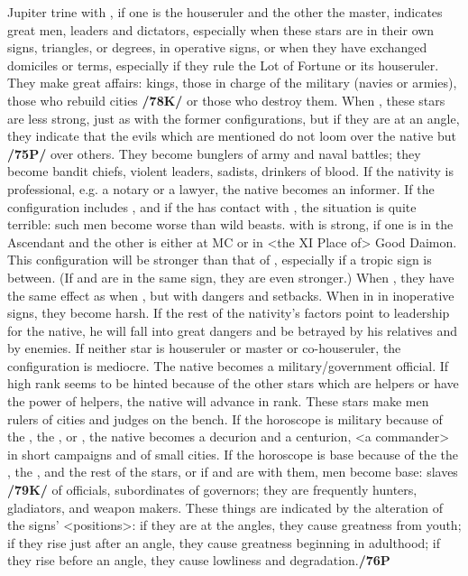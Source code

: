 Jupiter \marginnote{\Jupiter \Trine \Mars} trine with \Mars, if one is the houseruler and the other the master, indicates great men, leaders and dictators, especially when these stars are in their own signs, triangles, or degrees, in operative signs, or when they have exchanged domiciles or terms, especially if they rule the Lot of Fortune or its houseruler. They make great affairs: kings, those in charge of the military (navies or armies), those who rebuild cities
\textbf{/78K/} or those who destroy them. When \Sextile, these stars are less strong, just as with the former configurations, but if they are at an \mndl angle, they indicate that the evils which are mentioned do not loom over the native but \textbf{/75P/} over others. They become bunglers of army and naval battles; they become bandit chiefs, violent leaders, sadists, drinkers of blood. If the nativity is professional, e.g. a notary or a lawyer, the native becomes an informer. If the configuration includes \Mercury, and if the \Moon\xspace has contact with \Mars, the situation is quite terrible: such men become worse than wild beasts. \Jupiter\xspace \Square\xspace with \Mars\xspace is strong, if one is in the Ascendant and the other is either at MC or in <the
XI Place of> Good Daimon. This configuration will be stronger than that of \Trine, especially if a tropic
sign is between. (If \Jupiter\xspace and \Mars\xspace are in the same sign, they are even stronger.) When \Square, they
have the same effect as when \Trine, but with dangers and setbacks. When in \Opposition in inoperative signs, they become harsh. If the rest of the nativity’s factors point to leadership for the native, he will fall into great dangers and be betrayed by his relatives and by enemies. \mndl If neither star is houseruler or master or co-houseruler, the \Trine\xspace configuration is mediocre. The native becomes a military/government official. If high rank seems to be hinted because of the other stars which are helpers or have the power of helpers, the native will advance in rank. These stars make men rulers of cities and judges on the bench. If the horoscope is military because of the \Sun, the \Moon, or \Saturn, the native becomes a decurion and a centurion, <a commander> in short campaigns and of small cities. If the horoscope is base because of the the \Sun, the \Moon, and the rest of the stars, or if \Mars\xspace and \Jupiter\xspace are \Trine\xspace with them, men become base: slaves \textbf{/79K/} of officials, subordinates of governors; they are frequently hunters, gladiators, and weapon makers. \mndl These things are indicated by the alteration of the signs’ <positions>: if they are at the angles, they cause greatness from youth; if they rise just after an angle, they cause greatness beginning in adulthood; if they rise before an angle, they cause lowliness and degradation.\textbf{/76P}

\newpage